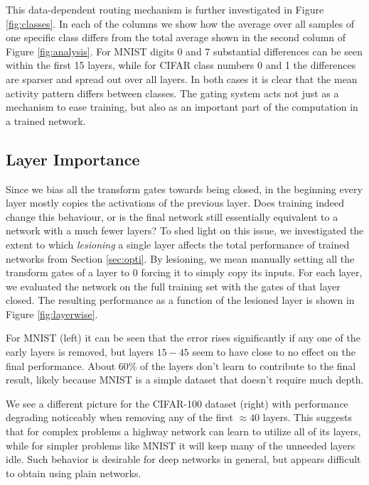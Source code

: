 \documentclass{article}
\begin{document}
This data-dependent routing mechanism is further investigated in Figure \ref{fig:classes}. 
In each of the columns we show how the average over all samples of one specific class differs from the total average shown in the second column of Figure \ref{fig:analysis}.
For MNIST digits 0 and 7 substantial differences can be seen within the first 15 layers, while for CIFAR class numbers 0 and 1 the differences are sparser and spread out over all layers.
In both cases it is clear that the mean activity pattern differs between classes.
The gating system acts not just as a mechanism to ease training, but also as an important part of the computation in a trained network.

\subsection{Layer Importance}

Since we bias all the transform gates towards being closed, in the beginning every layer mostly copies the activations of the previous layer. 
Does training indeed change this behaviour, or is the final network still essentially equivalent to a network with a much fewer layers?
To shed light on this issue, we investigated the extent to which \textit{lesioning} a single layer affects the total performance of trained networks from Section \ref{sec:opti}. By lesioning, we mean manually setting all the transform gates of a layer to 0 forcing it to simply copy its inputs.
For each layer, we evaluated the network on the full training set with the gates of that layer closed. The resulting performance as a function of the lesioned layer is shown in Figure \ref{fig:layerwise}.

For MNIST (left) it can be seen that the error rises significantly if any one of the early layers is removed, but layers $15-45$ seem to have close to no effect on the final performance. About 60\% of the layers don't learn to contribute to the final result, likely because MNIST is a simple dataset that doesn't require much depth.

We see a different picture for the CIFAR-100 dataset (right) with performance degrading noticeably when removing any of the first $\approx 40$ layers. 
This suggests that for complex problems a highway network can learn to utilize all of its layers, while for simpler problems like MNIST it will keep many of the unneeded layers idle. Such behavior is desirable for deep networks in general, but appears difficult to obtain using plain networks.
\end{document}
